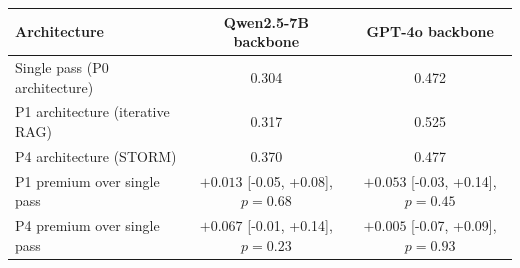 \begin{tabular}{lcc}
\toprule
Architecture & Qwen2.5-7B backbone & GPT-4o backbone\\
\midrule
Single pass (P0 architecture) & 0.304 & 0.472\\
P1 architecture (iterative RAG) & 0.317 & 0.525\\
P4 architecture (STORM) & 0.370 & 0.477\\
\midrule
P1 premium over single pass & $+0.013$ [-0.05, +0.08], $p{=}0.68$ & $+0.053$ [-0.03, +0.14], $p{=}0.45$\\
P4 premium over single pass & $+0.067$ [-0.01, +0.14], $p{=}0.23$ & $+0.005$ [-0.07, +0.09], $p{=}0.93$\\
\bottomrule
\end{tabular}
